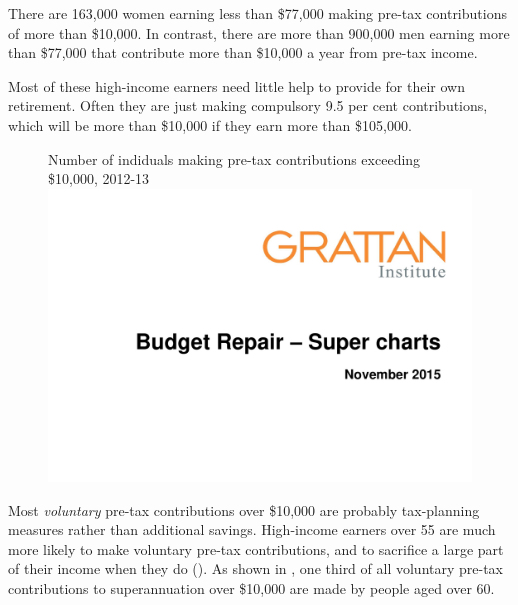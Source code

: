 \documentclass{grattanAlpha}
\begin{document}
There are 163,000 women earning less than \$77,000 making pre-tax contributions of more than \$10,000. In contrast, there are more than 900,000 men earning more than \$77,000 that contribute more than \$10,000 a year from pre-tax income.

Most of these high-income earners need little help to provide for their own retirement. Often they are just making compulsory 9.5 per cent contributions, which will be more than \$10,000 if they earn more than \$105,000.

\begin{figure}
%
{Number of indiduals making pre-tax contributions exceeding \$10,000, 2012-13}\label{fig:SUPER-4-6}
\includegraphics[width=\columnwidth,page=24]{super-atlas/PPTX.pdf}

\end{figure}

Most \emph{voluntary} pre-tax contributions over \$10,000 are probably tax-planning measures rather than additional savings. High-income earners over 55 are much more likely to make voluntary pre-tax contributions, and to sacrifice a large part of their income when they do (). As shown in , one third of all voluntary pre-tax contributions to superannuation over \$10,000 are made by people aged over 60. 
\end{document}
